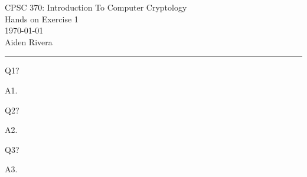 \documentclass[12pt,letterpaper, onecolumn]{exam}
\begin{document}
\nopointsinmargin
\pointformat{}

\begingroup
    \centering
    \LARGE CPSC 370: Introduction To Computer Cryptology\\
    \LARGE Hands on Exercise 1\\[0.5em]
    \large \today\\[0.5em]
    \large Aiden Rivera\par
\endgroup

\rule{\textwidth}{0.4pt}

\printanswers
\renewcommand{\solutiontitle}{\noindent\textbf{Ans:}\enspace}   %

\begin{questions}

    \question[0] Q1?
    
    \begin{solution}
            A1.
    \end{solution}
    
    \question[0] Q2?
    
    \begin{solution}
            A2.
    \end{solution}
    
    \question[0] Q3?
    
    \begin{solution}
            A3.
    \end{solution}
    
\end{questions}
\end{document}
